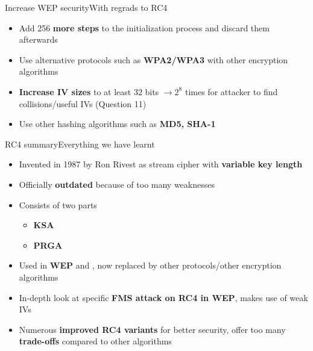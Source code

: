 \documentclass[
	aspectratio=169,	%
	onlytextwidth,		%
	t,					%
	]{beamer}
\begin{document}
\begin{frame}[fragile]{Increase WEP security}{With regrads to RC4}
	\begin{itemize}
		\item Add 256 \textbf{more steps} to the initialization process and discard them afterwards
		\item Use alternative protocols such as \textbf{WPA2/WPA3} with other encryption algorithms
		\item \textbf{Increase IV sizes} to at least $32$ bits $\rightarrow 2^{8}$ times for attacker to find collisions/useful IVs (Question 11)
		\item Use other hashing algorithms such as \textbf{MD5, SHA-1}
	\end{itemize}
\end{frame}

\begin{frame}[fragile]{RC4 summary}{Everything we have learnt}
	\begin{itemize}
		\item Invented in 1987 by Ron Rivest as stream cipher with \textbf{variable key length}
		\item Officially \textbf{outdated} because of too many weaknesses
		\item Consists of two parts
		\begin{itemize}
			\item \textbf{KSA}
			\item \textbf{PRGA}
		\end{itemize}
		\item Used in \textbf{WEP} and , now replaced by other protocols/other encryption algorithms
		\item In-depth look at specific \textbf{FMS attack on RC4 in WEP}, makes use of weak IVs
		\item Numerous \textbf{improved RC4 variants} for better security, offer too many \textbf{trade-offs} compared to other algorithms
	\end{itemize}
\end{frame}

\makethankyou

\begin{frame}
\printbibliography
\end{frame}
\end{document}
